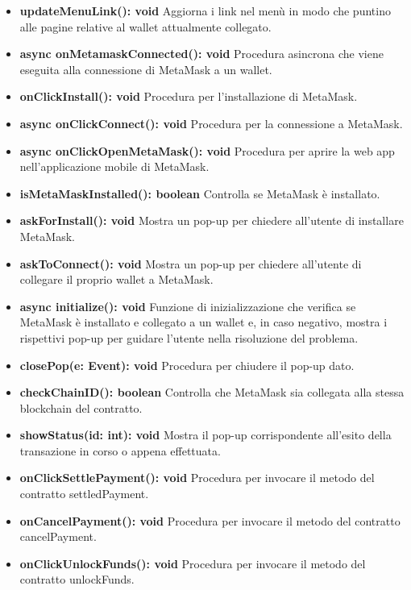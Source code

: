 \documentclass[a4paper, 12pt]{article}
\begin{document}
\begin{itemize}
    \item \textbf{updateMenuLink(): void} Aggiorna i link nel menù in modo che puntino alle pagine relative al wallet attualmente collegato.\\
    \item \textbf{async onMetamaskConnected(): void} Procedura asincrona che viene eseguita alla connessione di MetaMask a un wallet.\\
    \item \textbf{onClickInstall(): void} Procedura per l'installazione di MetaMask.\\
    \item \textbf{async onClickConnect(): void} Procedura per la connessione a MetaMask.\\
    \item \textbf{async onClickOpenMetaMask(): void} Procedura per aprire la web app nell'applicazione mobile di MetaMask.\\
    \item \textbf{isMetaMaskInstalled(): boolean} Controlla se MetaMask è installato.\\
    \item \textbf{askForInstall(): void} Mostra un pop-up per chiedere all'utente di installare MetaMask.\\
    \item \textbf{askToConnect(): void} Mostra un pop-up per chiedere all'utente di collegare il proprio wallet a MetaMask.\\
    \item \textbf{async initialize(): void} Funzione di inizializzazione che verifica se MetaMask è installato e collegato a un wallet e, in caso negativo, mostra i rispettivi pop-up per guidare l'utente nella risoluzione del problema.\\
    \item \textbf{closePop(e: Event): void} Procedura per chiudere il pop-up dato.\\
    \item \textbf{checkChainID(): boolean} Controlla che MetaMask sia collegata alla stessa blockchain del contratto.\\
    \item \textbf{showStatus(id: int): void} Mostra il pop-up corrispondente all'esito della transazione in corso o appena effettuata.\\
    \item \textbf{onClickSettlePayment(): void} Procedura per invocare il metodo del contratto settledPayment.\\
    \item \textbf{onCancelPayment(): void} Procedura per invocare il metodo del contratto cancelPayment.\\
    \item \textbf{onClickUnlockFunds(): void} Procedura per invocare il metodo del contratto unlockFunds.\\
\end{itemize}
\end{document}
